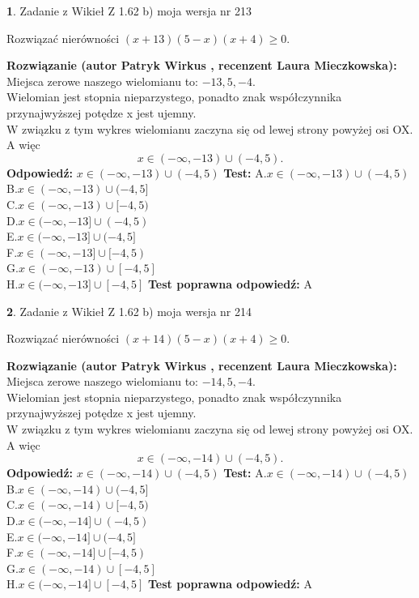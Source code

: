 \documentclass[12pt, a4paper]{article}
\theoremstyle{definition} %
\newtheorem{zad}{}
\newcommand{\zadStart}[1]{\begin{zad}#1\newline}
\newcommand{\zadStop}{\end{zad}}
\newcommand{\rozwStart}[2]{\noindent \textbf{Rozwiązanie (autor #1 , recenzent #2): }\newline}
\newcommand{\rozwStop}{\newline}
\newcommand{\odpStart}{\noindent \textbf{Odpowiedź:}\newline}
\newcommand{\odpStop}{\newline}
\newcommand{\testStart}{\noindent \textbf{Test:}\newline}
\newcommand{\testStop}{\newline}
\newcommand{\kluczStart}{\noindent \textbf{Test poprawna odpowiedź:}\newline}
\newcommand{\kluczStop}{\newline}
\begin{document}
\zadStart{Zadanie z Wikieł Z 1.62 b) moja wersja nr 213}

Rozwiązać nierówności $(x+13)(5-x)(x+4)\ge0$.
\zadStop
\rozwStart{Patryk Wirkus}{Laura Mieczkowska}
Miejsca zerowe naszego wielomianu to: $-13, 5, -4$.\\
Wielomian jest stopnia nieparzystego, ponadto znak współczynnika przy\linebreak najwyższej potędze x jest ujemny.\\ W związku z tym wykres wielomianu zaczyna się od lewej strony powyżej osi OX. A więc $$x \in (-\infty,-13) \cup (-4,5).$$
\rozwStop
\odpStart
$x \in (-\infty,-13) \cup (-4,5)$
\odpStop
\testStart
A.$x \in (-\infty,-13) \cup (-4,5)$\\
B.$x \in (-\infty,-13) \cup (-4,5]$\\
C.$x \in (-\infty,-13) \cup [-4,5)$\\
D.$x \in (-\infty,-13] \cup (-4,5)$\\
E.$x \in (-\infty,-13] \cup (-4,5]$\\
F.$x \in (-\infty,-13] \cup [-4,5)$\\
G.$x \in (-\infty,-13) \cup [-4,5]$\\
H.$x \in (-\infty,-13] \cup [-4,5]$
\testStop
\kluczStart
A
\kluczStop



\zadStart{Zadanie z Wikieł Z 1.62 b) moja wersja nr 214}

Rozwiązać nierówności $(x+14)(5-x)(x+4)\ge0$.
\zadStop
\rozwStart{Patryk Wirkus}{Laura Mieczkowska}
Miejsca zerowe naszego wielomianu to: $-14, 5, -4$.\\
Wielomian jest stopnia nieparzystego, ponadto znak współczynnika przy\linebreak najwyższej potędze x jest ujemny.\\ W związku z tym wykres wielomianu zaczyna się od lewej strony powyżej osi OX. A więc $$x \in (-\infty,-14) \cup (-4,5).$$
\rozwStop
\odpStart
$x \in (-\infty,-14) \cup (-4,5)$
\odpStop
\testStart
A.$x \in (-\infty,-14) \cup (-4,5)$\\
B.$x \in (-\infty,-14) \cup (-4,5]$\\
C.$x \in (-\infty,-14) \cup [-4,5)$\\
D.$x \in (-\infty,-14] \cup (-4,5)$\\
E.$x \in (-\infty,-14] \cup (-4,5]$\\
F.$x \in (-\infty,-14] \cup [-4,5)$\\
G.$x \in (-\infty,-14) \cup [-4,5]$\\
H.$x \in (-\infty,-14] \cup [-4,5]$
\testStop
\kluczStart
A
\kluczStop
\end{document}
